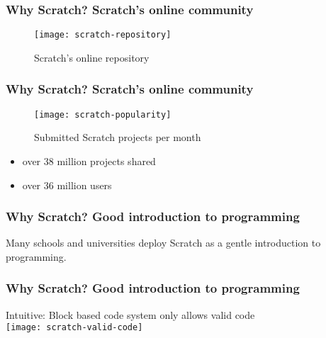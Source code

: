 \begin{frame}\frametitle{Why Scratch? Scratch's online community}
    \begin{figure}
        \texttt{[image: scratch-repository]}
        \caption{Scratch's online repository}
    \end{figure}
\end{frame}

\begin{frame}[shrink=0]\frametitle{Why Scratch? Scratch's online community}
    \begin{figure}
        \texttt{[image: scratch-popularity]}
        \caption{Submitted Scratch projects per month}
    \end{figure}
    \centering
    \begin{minipage}{.7\textwidth}
        \begin{itemize}
            \item over 38 million projects shared
            \item over 36 million users
        \end{itemize}
    \end{minipage}
\end{frame}

\begin{frame}\frametitle{Why Scratch? Good introduction to programming}
    Many schools and universities deploy Scratch as a gentle introduction to programming.
\end{frame}

\begin{frame}\frametitle{Why Scratch? Good introduction to programming}
    \centering
    Intuitive: Block based code system only allows valid code\\[\medskipamount]
    \texttt{[image: scratch-valid-code]}
\end{frame}

